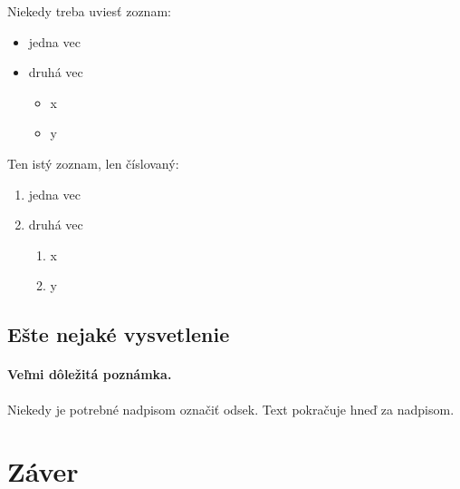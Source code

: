 \documentclass[10pt,twoside,slovak,a4paper]{article}
\begin{document}
Niekedy treba uviesť zoznam:

\begin{itemize}
\item jedna vec
\item druhá vec
	\begin{itemize}
	\item x
	\item y
	\end{itemize}
\end{itemize}

Ten istý zoznam, len číslovaný:

\begin{enumerate}
\item jedna vec
\item druhá vec
	\begin{enumerate}
	\item x
	\item y
	\end{enumerate}
\end{enumerate}


\subsection{Ešte nejaké vysvetlenie} \label{ina:este}

\paragraph{Veľmi dôležitá poznámka.}
Niekedy je potrebné nadpisom označiť odsek. Text pokračuje hneď za nadpisom.


\section{Záver} \label{zaver} %






\end{document}
